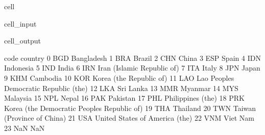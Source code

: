 \documentclass[letterpaper,10pt,english]{jupyterBook}
\begin{document}
\begin{sphinxuseclass}{cell}\begin{sphinxVerbatimInput}

\begin{sphinxuseclass}{cell_input}
\begin{sphinxVerbatim}[commandchars=\\\{\}]
\end{sphinxVerbatim}

\end{sphinxuseclass}\end{sphinxVerbatimInput}
\begin{sphinxVerbatimOutput}

\begin{sphinxuseclass}{cell_output}
\begin{sphinxVerbatim}[commandchars=\\\{\}]
   code                                      country  \PYGZbs{}
0   BGD                                   Bangladesh   
1   BRA                                       Brazil   
2   CHN                                        China   
3   ESP                                        Spain   
4   IDN                                    Indonesia   
5   IND                                        India   
6   IRN                   Iran (Islamic Republic of)   
7   ITA                                        Italy   
8   JPN                                        Japan   
9   KHM                                     Cambodia   
10  KOR                      Korea (the Republic of)   
11  LAO       Lao People\PYGZsq{}s Democratic Republic (the)   
12  LKA                                    Sri Lanka   
13  MMR                                      Myanmar   
14  MYS                                     Malaysia   
15  NPL                                        Nepal   
16  PAK                                     Pakistan   
17  PHL                            Philippines (the)   
18  PRK  Korea (the Democratic People\PYGZsq{}s Republic of)   
19  THA                                     Thailand   
20  TWN                   Taiwan (Province of China)   
21  USA               United States of America (the)   
22  VNM                                     Viet Nam   
23  NaN                                          NaN   


\end{sphinxVerbatim}
\end{sphinxuseclass}
\end{sphinxVerbatimOutput}
\end{sphinxuseclass}
\end{document}
